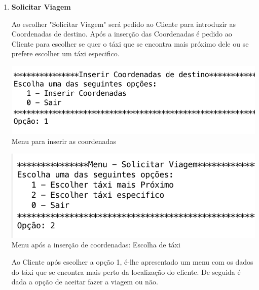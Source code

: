 \begin{enumerate}
	\item \textbf{Solicitar Viagem}

Ao escolher "Solicitar Viagem" será pedido ao Cliente para introduzir as Coordenadas de destino. Após a inserção das Coordenadas é pedido ao Cliente para escolher se quer o táxi que se encontra mais próximo dele ou se prefere escolher um táxi especifico. 

\noindent\begin{minipage}[b]{.5\textwidth}
	\includegraphics[scale=0.55]{imagem/inserirDestino}
	\small{Menu para inserir as coordenadas}
\end{minipage} 
\hfill
\begin{minipage}[b]{.45\textwidth}
	\includegraphics[scale=0.55]{imagem/coorInseridas}
	\small{Menu após a inserção de coordenadas: Escolha de táxi}
\end{minipage}
\hfill

Ao Cliente após escolher a opção 1, é-lhe apresentado um menu com os dados do táxi que se encontra mais perto da localização do cliente. De seguida é dada a opção de aceitar fazer a viagem ou não. 


\end{enumerate}
